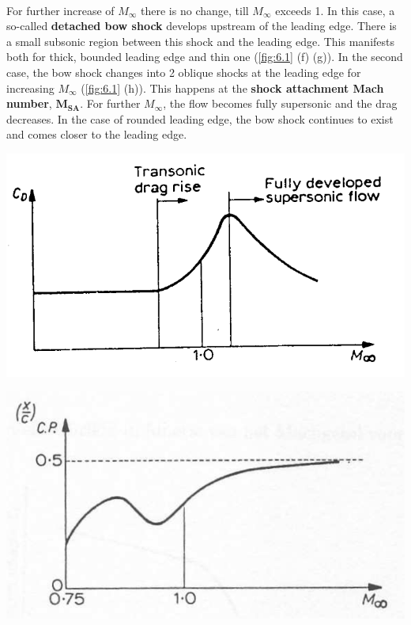 	\ \\ For further increase of $M_\infty$ there is no change, till $M_\infty$ exceeds 1. In this case, a so-called \textbf{detached bow shock} develops upstream of the leading edge. There is a small subsonic region between this shock and the leading edge. This manifests both for thick, bounded leading edge and thin one (\autoref{fig:6.1} (f) (g)). In the second case, the bow shock changes into 2 oblique shocks at the leading edge for increasing $M_\infty$ (\autoref{fig:6.1} (h)). This happens at the \textbf{shock attachment Mach number}, $\bm{M_{SA}}$. For further $M_{\infty}$, the flow becomes fully supersonic and the drag decreases. In the case of rounded leading edge, the bow shock continues to exist and comes closer to the leading edge. 
	
	\begin{center}
	\begin{minipage}{0.3\textwidth}
	\includegraphics[scale=0.3]{ch6/2}
	\label{fig:6.2}
	\end{minipage}
	\begin{minipage}{0.3\textwidth}
	\includegraphics[scale=0.3]{ch6/3}
	\label{fig:6.3}
	\end{minipage}
	\end{center}
	
